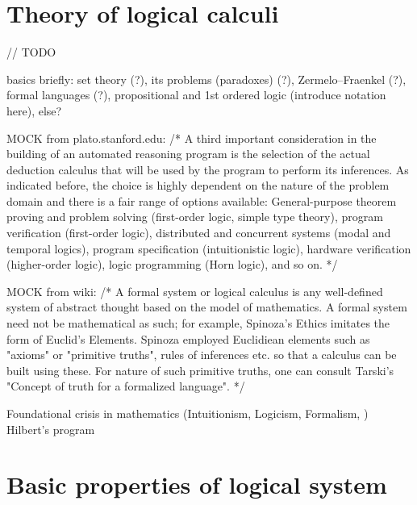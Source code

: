 \documentclass[article]{aaltoseries}
\begin{document}

\section{Theory of logical calculi}
\label{sec:formal_theory}
// TODO

basics briefly: set theory (?), its problems (paradoxes) (?), Zermelo–Fraenkel (?), formal languages (?), propositional and 1st ordered logic (introduce notation here), else?


MOCK from plato.stanford.edu: %
/* A third important consideration in the building of an automated reasoning program is the selection of the actual deduction calculus that will be used by the program to perform its inferences. As indicated before, the choice is highly dependent on the nature of the problem domain and there is a fair range of options available: General-purpose theorem proving and problem solving (first-order logic, simple type theory), program verification (first-order logic), distributed and concurrent systems (modal and temporal logics), program specification (intuitionistic logic), hardware verification (higher-order logic), logic programming (Horn logic), and so on. */

MOCK from wiki: /* A formal system or logical calculus is any well-defined system of abstract thought based on the model of mathematics. A formal system need not be mathematical as such; for example, Spinoza's Ethics imitates the form of Euclid's Elements. Spinoza employed Euclidiean elements such as "axioms" or "primitive truths", rules of inferences etc. so that a calculus can be built using these. For nature of such primitive truths, one can consult Tarski's "Concept of truth for a formalized language". */

Foundational crisis in mathematics (Intuitionism, Logicism, Formalism, ) Hilbert’s program


\section{Basic properties of logical system}
\label{sec:logic_properties}
\end{document}
